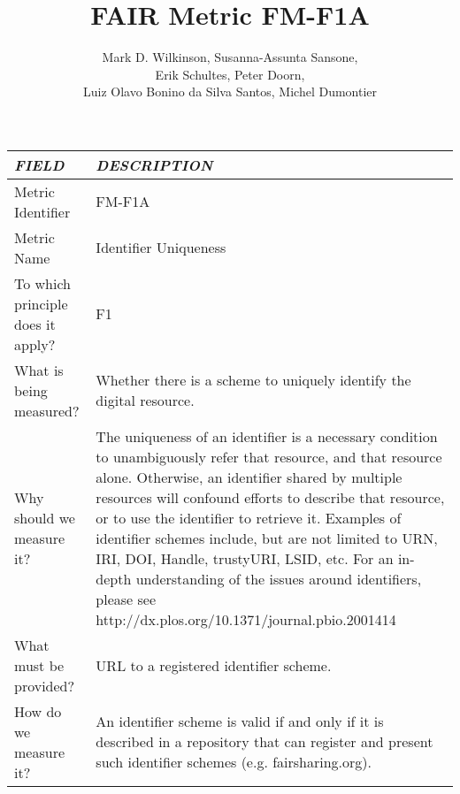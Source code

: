\documentclass[english]{article}
\begin{document}
\title{FAIR Metric FM-F1A}

\author{Mark D. Wilkinson, Susanna-Assunta Sansone, \\Erik Schultes, Peter Doorn,\\ 
Luiz Olavo Bonino da Silva Santos, Michel Dumontier}

\maketitle
\thispagestyle{fancy}


\begin{table}
\centering

\begin{tabular}{|p{5cm}|p{8cm}|}
\hline
\emph{FIELD} & \emph{DESCRIPTION} \\
\hline
Metric Identifier &   FM-F1A
 \\


\hline
Metric Name &   Identifier Uniqueness \\



\hline
To which principle does it apply? &   F1\\



\hline
What is being measured? & Whether there is a scheme to uniquely identify the digital resource.\\



\hline
Why should we measure it? & 
The uniqueness of an identifier is a necessary condition to unambiguously refer that resource, and that resource alone. Otherwise, an identifier shared by multiple resources will confound efforts to describe that resource, or to use the identifier to retrieve it. Examples of identifier schemes include, but are not limited to URN, IRI, DOI, Handle, trustyURI, LSID, etc. For an in-depth understanding of the issues around identifiers, please see http://dx.plos.org/10.1371/journal.pbio.2001414  
\\



\hline
What must be provided? &  URL to a registered identifier scheme. \\



\hline
How do we measure it? &  
An identifier scheme is valid if and only if it is described in a repository that can register and present such identifier schemes (e.g. fairsharing.org). \newline
\newline


\end{tabular}
\end{table}
\end{document}
